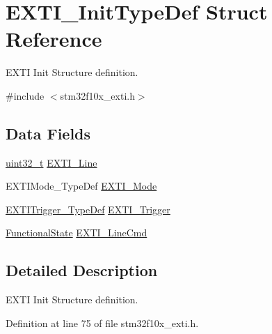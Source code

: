 \hypertarget{struct_e_x_t_i___init_type_def}{\section{E\-X\-T\-I\-\_\-\-Init\-Type\-Def Struct Reference}
\label{struct_e_x_t_i___init_type_def}
}


E\-X\-T\-I Init Structure definition.  




{\ttfamily \#include $<$stm32f10x\-\_\-exti.\-h$>$}

\subsection*{Data Fields}
\begin{DoxyCompactItemize}
\item 
\hyperlink{stdint_8h_a435d1572bf3f880d55459d9805097f62}{uint32\-\_\-t} \hyperlink{struct_e_x_t_i___init_type_def_a1b5bb38e1df331f764b830a1e8ec171f}{E\-X\-T\-I\-\_\-\-Line}
\item 
E\-X\-T\-I\-Mode\-\_\-\-Type\-Def \hyperlink{struct_e_x_t_i___init_type_def_a741816862b9cd43cc80781dc89150e7e}{E\-X\-T\-I\-\_\-\-Mode}
\item 
\hyperlink{stm32f10x__exti_8h_a9da190f5425d1b421a06bced8cc48e9b}{E\-X\-T\-I\-Trigger\-\_\-\-Type\-Def} \hyperlink{struct_e_x_t_i___init_type_def_ab0bd8417e78fe2b43eed79e44064510c}{E\-X\-T\-I\-\_\-\-Trigger}
\item 
\hyperlink{group___exported__types_gac9a7e9a35d2513ec15c3b537aaa4fba1}{Functional\-State} \hyperlink{struct_e_x_t_i___init_type_def_ac1769bc5badaef4cffbcf105e3fe1c27}{E\-X\-T\-I\-\_\-\-Line\-Cmd}
\end{DoxyCompactItemize}


\subsection{Detailed Description}
E\-X\-T\-I Init Structure definition. 

Definition at line 75 of file stm32f10x\-\_\-exti.\-h.



